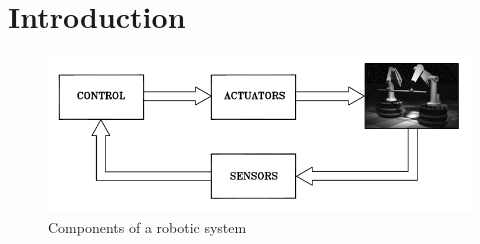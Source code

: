 \chapter{Introduction}
\vspace{-0.7em}
\minitoc
\begin{figure}[h]
    \centering
    \includegraphics[scale=0.8]{img/robotic_system.png}
    \caption{Components of a robotic system}
\end{figure}
\vspace{-0.5cm}
